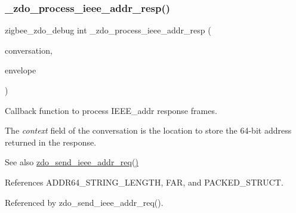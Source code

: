 \mbox{\label{group__zdo_gad723bd899ccda9ec96f6226893c1335b}} 
\subsubsection{\texorpdfstring{\+\_\+zdo\+\_\+process\+\_\+ieee\+\_\+addr\+\_\+resp()}{\_zdo\_process\_ieee\_addr\_resp()}}
{\footnotesize\ttfamily zigbee\+\_\+zdo\+\_\+debug int \+\_\+zdo\+\_\+process\+\_\+ieee\+\_\+addr\+\_\+resp (\begin{DoxyParamCaption}\item[{\hyperlink{structwpan__conversation__t}{wpan\+\_\+conversation\+\_\+t} \hyperlink{group__hal_gaef060b3456fdcc093a7210a762d5f2ed}{F\+AR} $\ast$}]{conversation,  }\item[{const \hyperlink{structwpan__envelope__t}{wpan\+\_\+envelope\+\_\+t} \hyperlink{group__hal_gaef060b3456fdcc093a7210a762d5f2ed}{F\+AR} $\ast$}]{envelope }\end{DoxyParamCaption})}



Callback function to process I\+E\+E\+E\+\_\+addr response frames. 

The {\itshape context} field of the conversation is the location to store the 64-\/bit address returned in the response.

\begin{DoxySeeAlso}{See also}
\hyperlink{group__zdo_ga4af5f8d70054f7883dbc1305e3a3f181}{zdo\+\_\+send\+\_\+ieee\+\_\+addr\+\_\+req()} 
\end{DoxySeeAlso}


References A\+D\+D\+R64\+\_\+\+S\+T\+R\+I\+N\+G\+\_\+\+L\+E\+N\+G\+TH, F\+AR, and P\+A\+C\+K\+E\+D\+\_\+\+S\+T\+R\+U\+CT.



Referenced by zdo\+\_\+send\+\_\+ieee\+\_\+addr\+\_\+req().

\mbox{\label{group__zdo_ga9c1afb2178cc3e3b515373c7e351fc02}} 
